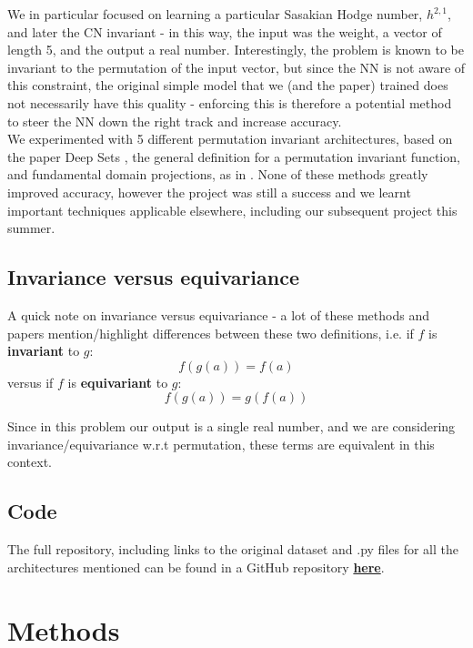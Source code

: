 \documentclass{article}
\begin{document}
We in particular focused on learning a particular Sasakian Hodge number, $h^{2,1}$, and later the CN invariant - in this way, the input was the weight, a vector of length 5, and the output a real number. Interestingly, the problem is known to be invariant to the permutation of the input vector, but since the NN is not aware of this constraint, the original simple model that we (and the paper) trained does not necessarily have this quality - enforcing this is therefore a potential method to steer the NN down the right track and increase accuracy.\\

We experimented with 5 different permutation invariant architectures, based on the paper Deep Sets \cite{zaheer2018deepsets}, the general definition for a permutation invariant function, and fundamental domain projections, as in \cite{aslan2022groupinvariantmachinelearning}. None of these methods greatly improved accuracy, however the project was still a success and we learnt important techniques applicable elsewhere, including our subsequent project this summer. \\

\subsection{Invariance versus equivariance}

A quick note on invariance versus equivariance - a lot of these methods and papers mention/highlight differences between these two definitions, i.e. if $f$ is \textbf{invariant} to $g$:
$$f\left(g\left(a\right)\right) = f\left(a\right)$$
\indent versus if $f$ is \textbf{equivariant} to $g$:
$$f\left(g\left(a\right)\right) = g\left(f\left(a\right)\right)$$

\noindent Since in this problem our output is a single real number, and we are considering invariance/equivariance w.r.t permutation, these terms are equivalent in this context.

\subsection{Code}
The full repository, including links to the original dataset and .py files for all the architectures mentioned can be found in a GitHub repository \href{https://github.com/hrobijns/group_inv_ML_imperial}{\textbf{here}}.

\newpage

\section{Methods}
\end{document}
